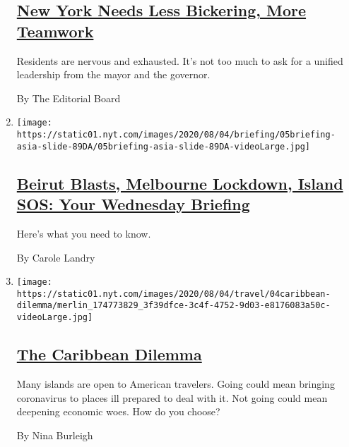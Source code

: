 \begin{enumerate}
  \hypertarget{new-york-needs-less-bickering-more-teamwork}{%
  \subsection{\texorpdfstring{\href{/2020/08/04/opinion/cuomo-de-blasio-coronavirus-nyc.html}{New
  York Needs Less Bickering, More
  Teamwork}}{New York Needs Less Bickering, More Teamwork}}\label{new-york-needs-less-bickering-more-teamwork}}

  Residents are nervous and exhausted. It's not too much to ask for a
  unified leadership from the mayor and the governor.

  By The Editorial Board
\item
  \texttt{[image: https://static01.nyt.com/images/2020/08/04/briefing/05briefing-asia-slide-89DA/05briefing-asia-slide-89DA-videoLarge.jpg]}

  \hypertarget{beirut-blasts-melbourne-lockdown-island-sos-your-wednesday-briefing}{%
  \subsection{\texorpdfstring{\href{/2020/08/04/briefing/beirut-explosion-melbourne-lockdown-pakistan.html}{Beirut
  Blasts, Melbourne Lockdown, Island SOS: Your Wednesday
  Briefing}}{Beirut Blasts, Melbourne Lockdown, Island SOS: Your Wednesday Briefing}}\label{beirut-blasts-melbourne-lockdown-island-sos-your-wednesday-briefing}}

  Here's what you need to know.

  By Carole Landry
\item
  \texttt{[image: https://static01.nyt.com/images/2020/08/04/travel/04caribbean-dilemma/merlin\_174773829\_3f39dfce-3c4f-4752-9d03-e8176083a50c-videoLarge.jpg]}

  \hypertarget{the-caribbean-dilemma}{%
  \subsection{\texorpdfstring{\href{/2020/08/04/travel/coronavirus-caribbean-vacations.html}{The
  Caribbean
  Dilemma}}{The Caribbean Dilemma}}\label{the-caribbean-dilemma}}

  Many islands are open to American travelers. Going could mean bringing
  coronavirus to places ill prepared to deal with it. Not going could
  mean deepening economic woes. How do you choose?

  By Nina Burleigh
\end{enumerate}

